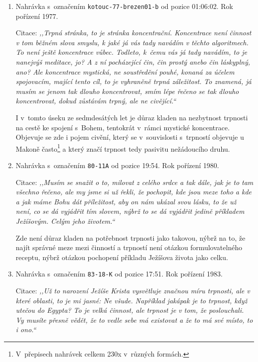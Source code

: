 \begin{enumerate}
{    Příklad školy Karla Weinfurtera z~pohledu Karla Makoně je užit pro
    demonstraci nezbytnosti trpného přístupu. Je zde postulována nezbytnost
    trpnosti pro vstup do Království Božího.
  }
  \item{
      Nahrávka s~označením \texttt{kotouc-77-brezen01-b} od pozice 01:06:02. Rok pořízení 1977.

      Citace: \textit{%
        ,,Trpná stránka, to je stránka koncentrační. Koncentrace není činnost v
        tom běžném slova smyslu, k jaké já vás tady navádím v těchto
        algoritmech. To není ještě koncentrace vůbec. Todleto, k~čemu vás
        já tady navádím, to je nanejvýš meditace, jo? A z ní pocházející čin, čin
        prostý anebo čin láskyplný, ano? Ale koncentrace mystická, ne
        soustředění pouhé, konaná za účelem spojovacím, mající tento cíl, to je
        vyhraněně trpná záležitost. To znamená, já musím se jenom tak dlouho
        koncentrovat, smím lépe řečeno se tak dlouho koncentrovat, dokud
        zůstávám trpný, ale ne civějící.``
      }

      I v~tomto úseku ze sedmdesátých let je důraz kladen na nezbytnost trpnosti
      na cestě ke spojení s~Bohem, tentokrát v~rámci mystické koncentrace.
      Objevuje se zde i pojem civění, který se v~souvislosti s~trpností objevuje
      u Makoně často\footnote{V~přepisech nahrávek celkem 230x v~různých
      formách.} a který značí trpnost tedy pasivitu nežádoucího
      druhu.
  }
  \item{
      Nahrávka s~označením \texttt{80-11A} od pozice 19:54. Rok pořízení 1980.

      Citace: \textit{%
        ,,Musím se snažit o to, milovat z celého srdce a tak dále, jak je to tam
        všechno řečeno, ale my jsme si už řekli, že pochopit, kde jsou meze toho
        a kde a jak máme Bohu dát příležitost, aby on nám ukázal svou lásku, to
        že už není, co se dá vyjádřit tím slovem, nýbrž to se dá vyjádřit jedině
        příkladem Ježíšovým. Celým jeho životem.``
      }

      Zde není důraz kladen na potřebnost trpnosti jako takovou, nýbrž na to, že
      najít správné meze mezi činností a trpností není otázkou formulovatelného
      receptu, nýbrž otázkou pochopení příkladu Ježíšova života jako celku.
  }
  \item{
      Nahrávka s~označením \texttt{83-18-K} od pozice 17:51. Rok pořízení 1983.

      Citace: \textit{%
        ,,Už to narození Ježíše Krista vysvětluje značnou míru trpnosti, ale v
        které oblasti, to je mi jasné: Ne všude. Například jakápak je to
        trpnost, když utečou do Egypta? To je velká činnost, ale trpnost je v
        tom, že poslouchali. Vy musíte přesně vědět, že to vedle sebe má
        existovat a že to má své místo, to i ono.``
      }

}
\end{enumerate}
